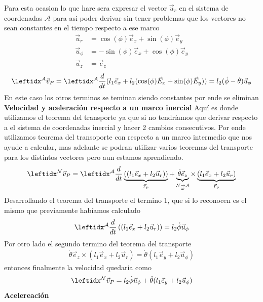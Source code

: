 \begin{tcolorbox}[title=Solucion sistema Doble varilla,breakable]
        Para esta ocasion lo que hare sera expresar el vector $\vec{u}_r$ en el sistema de coordenadas $\mathcal{A}$ para asi poder derivar sin tener problemas que los vectores no sean constantes en el tiempo respecto a ese marco
        \begin{equation*}
\begin{split}
    \vec{u}_r&=\cos(\phi)\vec{e}_x+\sin(\phi)\vec{e}_y\\
    \vec{u}_\phi&=-\sin(\phi)\vec{e}_x+\cos(\phi)\vec{e}_y\\
    \vec{u}_z&=\vec{e}_z
\end{split}
\end{equation*}
\begin{equation*}
            \marc{}{A}\vec{v}_P=\der{}{A}{(l_1\vec{e}_x+l_2(\cos(\phi)\vec{E}_x+\sin(\phi)\vec{E}_y))} =l_2(\dot\phi-\dot\theta)\vec{u}_\phi
\end{equation*}
En este caso los otros terminos se teminan siendo constantes por ende se eliminan\\
        \textbf{Velocidad y aceleración respecto a un marco inercial}
        Aquí es donde utilizamos el teorema del transporte ya que si no tendríamos que derivar respecto a el sistema de coordenadas inercial y hacer 2 cambios consecutivos. Por ende utilizamos teorema del transoporte con respecto a un marco intermedio que nos ayude a calcular, mas adelante se podran utilizar varios teoremas del transporte para los distintos vectores pero aun estamos aprendiendo.
        \begin{equation*}
            \marc{}{N}\vec{v}_P=\transD{(l_1\vec{e}_x+l_2\vec{u}_r)}{\dot\theta\vec{e}_z}{N}{A}{\vec{r}_p}
        \end{equation*}
        Desarrollando el teorema del transporte el termino 1, que si lo reconocen es el mismo que previamente habíamos calculado
        \begin{align*}
            \der{}{A}\left((l_1\vec{e}_x+l_2\vec{u}_r)\right)=l_2\dot\phi\vec{u}_\phi
        \end{align*}
        Por otro lado el segundo termino del teorema del transporte
        \begin{align*}
            \dot\theta\vec{e}_z\times (l_1\vec{e}_x+l_2\vec{u}_r)=\dot\theta(l_1\vec{e}_y+l_2\vec{u}_\phi)
        \end{align*}
        entonces finalmente la velocidad quedaria como
        $$\marc{}{N}\vec{v}_P=l_2\dot\phi\vec{u}_\phi+\dot\theta(l_1\vec{e}_y+l_2\vec{u}_\phi)$$
    \textbf{Acelereación}\\

\end{tcolorbox}
